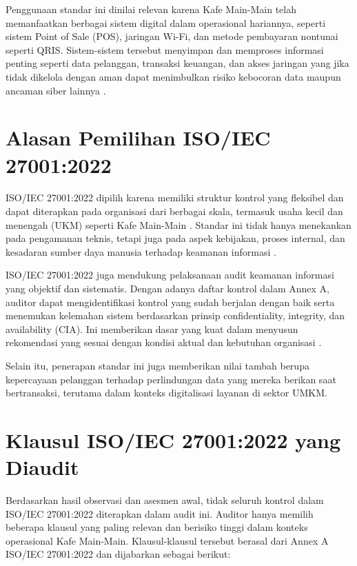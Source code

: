 \documentclass[12pt, a4paper]{report}
\begin{document}
Penggunaan standar ini dinilai relevan karena Kafe Main-Main telah memanfaatkan berbagai sistem digital dalam operasional hariannya, seperti sistem Point of Sale (POS), jaringan Wi-Fi, dan metode pembayaran nontunai seperti QRIS. Sistem-sistem tersebut menyimpan dan memproses informasi penting seperti data pelanggan, transaksi keuangan, dan akses jaringan yang jika tidak dikelola dengan aman dapat menimbulkan risiko kebocoran data maupun ancaman siber lainnya \citep{cafedigital}.

\section{Alasan Pemilihan ISO/IEC 27001:2022}

ISO/IEC 27001:2022 dipilih karena memiliki struktur kontrol yang fleksibel dan dapat diterapkan pada organisasi dari berbagai skala, termasuk usaha kecil dan menengah (UKM) seperti Kafe Main-Main \citep{rijal2022iso}. Standar ini tidak hanya menekankan pada pengamanan teknis, tetapi juga pada aspek kebijakan, proses internal, dan kesadaran sumber daya manusia terhadap keamanan informasi \citep{permatasari2023manajemen}.

ISO/IEC 27001:2022 juga mendukung pelaksanaan audit keamanan informasi yang objektif dan sistematis. Dengan adanya daftar kontrol dalam Annex A, auditor dapat mengidentifikasi kontrol yang sudah berjalan dengan baik serta menemukan kelemahan sistem berdasarkan prinsip confidentiality, integrity, dan availability (CIA). Ini memberikan dasar yang kuat dalam menyusun rekomendasi yang sesuai dengan kondisi aktual dan kebutuhan organisasi \citep{ratnasari2021penerapan}.

Selain itu, penerapan standar ini juga memberikan nilai tambah berupa kepercayaan pelanggan terhadap perlindungan data yang mereka berikan saat bertransaksi, terutama dalam konteks digitalisasi layanan di sektor UMKM.

\section{Klausul ISO/IEC 27001:2022 yang Diaudit}

Berdasarkan hasil observasi dan asesmen awal, tidak seluruh kontrol dalam ISO/IEC 27001:2022 diterapkan dalam audit ini. Auditor hanya memilih beberapa klausul yang paling relevan dan berisiko tinggi dalam konteks operasional Kafe Main-Main. Klausul-klausul tersebut berasal dari Annex A ISO/IEC 27001:2022 dan dijabarkan sebagai berikut:
\end{document}
